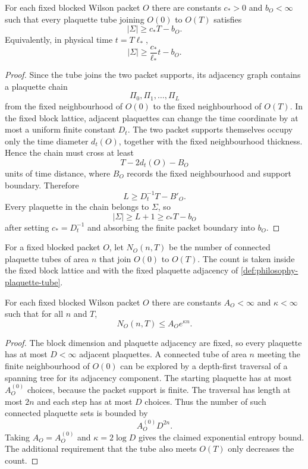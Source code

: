 \begin{theorem}
\label{thm:philosophy-tube-area-lower-bound}
For each fixed blocked Wilson packet $O$ there are constants
$c_{\ast}>0$ and $b_O<\infty$ such that every plaquette tube joining
$O(0)$ to $O(T)$ satisfies
$$
|\Sigma|\ge c_{\ast}T-b_O.
$$
Equivalently, in physical time $t=T\ell_{\ast}$,
$$
|\Sigma|\ge \frac{c_{\ast}}{\ell_{\ast}}t-b_O.
$$
\end{theorem}
\begin{proof}
Since the tube joins the two packet supports, its adjacency graph
contains a plaquette chain
$$
\Pi_0,\Pi_1,\ldots,\Pi_L
$$
from the fixed neighbourhood of $O(0)$ to the fixed neighbourhood of
$O(T)$. In the fixed block lattice, adjacent plaquettes can change the
time coordinate by at most a uniform finite constant $D_t$. The two
packet supports themselves occupy only the time diameter $d_t(O)$,
together with the fixed neighbourhood thickness. Hence the chain must
cross at least
$$
T-2d_t(O)-B_O
$$
units of time distance, where $B_O$ records the fixed neighbourhood
and support boundary. Therefore
$$
L\ge D_t^{-1}T-B'_O.
$$
Every plaquette in the chain belongs to $\Sigma$, so
$$
|\Sigma|\ge L+1\ge c_{\ast}T-b_O
$$
after setting $c_{\ast}=D_t^{-1}$ and absorbing the finite packet
boundary into $b_O$.
\end{proof}

\begin{definition}
\label{def:philosophy-tube-counting-function}
For a fixed blocked packet $O$, let $N_O(n,T)$ be the number of
connected plaquette tubes of area $n$ that join $O(0)$ to $O(T)$.
The count is taken inside the fixed block lattice and with the fixed
plaquette adjacency of \autoref{def:philosophy-plaquette-tube}.
\end{definition}

\begin{theorem}
\label{thm:philosophy-tube-entropy-bound}
For each fixed blocked Wilson packet $O$ there are constants
$A_O<\infty$ and $\kappa<\infty$ such that for all $n$ and $T$,
$$
N_O(n,T)\le A_Oe^{\kappa n}.
$$
\end{theorem}
\begin{proof}
The block dimension and plaquette adjacency are fixed, so every
plaquette has at most $D<\infty$ adjacent plaquettes. A connected tube
of area $n$ meeting the finite neighbourhood of $O(0)$ can be explored
by a depth-first traversal of a spanning tree for its adjacency
component. The starting plaquette has at most $A_O^{(0)}$ choices,
because the packet support is finite. The traversal has length at most
$2n$ and each step has at most $D$ choices. Thus the number of such
connected plaquette sets is bounded by
$$
A_O^{(0)}D^{2n}.
$$
Taking $A_O=A_O^{(0)}$ and $\kappa=2\log D$ gives the claimed
exponential entropy bound. The additional requirement that the tube
also meets $O(T)$ only decreases the count.
\end{proof}

